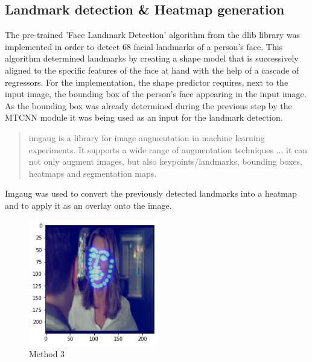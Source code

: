 \subsection{Landmark detection \& Heatmap generation}
The pre-trained 'Face Landmark Detection' algorithm \citep{Kazemi:2014:ShapePredictor} from the dlib library was implemented in order to detect 68 facial landmarks of a person's face. This algorithm determined landmarks by creating a shape model that is successively aligned to the specific features of the face at hand with the help of a cascade of regressors.
\newline\newline
For the implementation, the shape predictor requires, next to the input image, the bounding box of the person's face appearing in the input image. As the bounding box was already determined during the previous step by the \gls{MTCNN} module it was being used as an input for the landmark detection. \citep{Datahacker:2020:DlibFacialLandmarks}
\newline\newline

\begin{quote}
    imgaug is a library for image augmentation in machine learning experiments. It supports a wide range of augmentation techniques ... it can not only augment images, but also keypoints/landmarks, bounding boxes, heatmaps and segmentation maps. \citep[~para. 1]{Jung:2020:Imgaug}
\end{quote}
Imgaug was used to convert the previously detected landmarks into a heatmap and to apply it as an overlay onto the image.

\begin{center}
\begin{figure}[H]
  \begin{center}
  \includegraphics[angle=0, width=0.5\textwidth]{Figures/method_3.png}
  \caption{Method 3}
  \label{fig:MachineLearningModelMethod_3}
  \end{center}
\end{figure}
\end{center}

